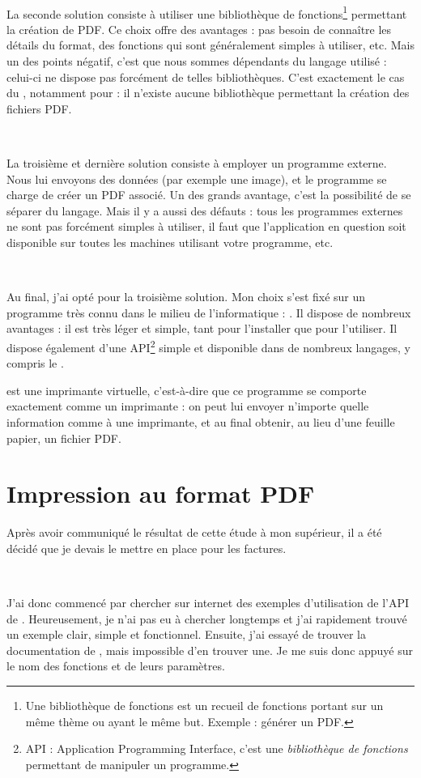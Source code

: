 ~

La seconde solution consiste à utiliser une bibliothèque de fonctions\footnote{Une bibliothèque de fonctions est un recueil de fonctions portant sur un même thème ou ayant le même but. Exemple : générer un PDF.} permettant la création de PDF. Ce choix offre des avantages : pas besoin de connaître les détails du format, des fonctions qui sont généralement simples à utiliser, etc. Mais un des points négatif, c'est que nous sommes dépendants du langage utilisé : celui-ci ne dispose pas forcément de telles bibliothèques. C'est exactement le cas du \vb, notamment pour  : il n'existe aucune bibliothèque permettant la création des fichiers PDF.

~

La troisième et dernière solution consiste à employer un programme externe. Nous lui envoyons des données (par exemple une image), et le programme se charge de créer un PDF associé. Un des grands avantage, c'est la possibilité de se séparer du langage. Mais il y a aussi des défauts : tous les programmes externes ne sont pas forcément simples à utiliser, il faut que l'application en question soit disponible sur toutes les machines utilisant votre programme, etc.

~

Au final, j'ai opté pour la troisième solution. Mon choix s'est fixé sur un programme très connu dans le milieu de l'informatique : \pdfcreator. Il dispose de nombreux avantages : il est très léger et simple, tant pour l'installer que pour l'utiliser. Il dispose également d'une API\footnote{API : Application Programming Interface, c'est une \emph{bibliothèque de fonctions} permettant de manipuler un programme.} simple et disponible dans de nombreux langages, y compris le \vb.

\pdfcreator{} est une imprimante virtuelle, c'est-à-dire que ce programme se comporte exactement comme un imprimante : on peut lui envoyer n'importe quelle information comme à une imprimante, et au final obtenir, au lieu d'une feuille papier, un fichier PDF.

\section{Impression au format PDF}
Après avoir communiqué le résultat de cette étude à mon supérieur, il a été décidé que je devais le mettre en place pour les factures.

~

J'ai donc commencé par chercher sur internet des exemples d'utilisation de l'API de \pdfcreator. Heureusement, je n'ai pas eu à chercher longtemps et j'ai rapidement trouvé un exemple clair, simple et fonctionnel. Ensuite, j'ai essayé de trouver la documentation de \pdfcreator, mais impossible d'en trouver une. Je me suis donc appuyé sur le nom des fonctions et de leurs paramètres.

